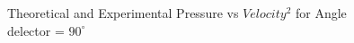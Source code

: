\documentclass[12pt,a4paper]{article}
\begin{document}
\begin{figure}[!ht]
	\begin{center}
	\end{center}
	\caption{Theoretical and Experimental Pressure vs $Velocity^{2}$ for Angle delector = $90 ^{\circ}$}
\end{figure}

\newpage
\end{document}
